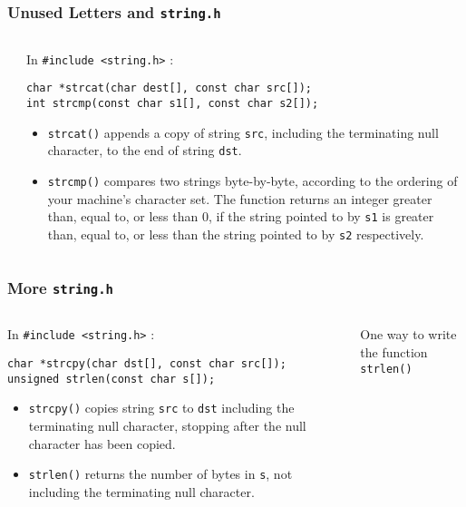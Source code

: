 \begin{frame}[fragile]
\frametitle{Unused Letters and {\tt string.h}}
\begin{columns}

\begin{column}{0.45\textwidth}

\end{column}

\pause
\begin{column}{0.45\textwidth}
In \verb^#include <string.h>^ :
{\small
\begin{verbatim}
char *strcat(char dest[], const char src[]);
int strcmp(const char s1[], const char s2[]);
\end{verbatim}
}
\begin{itemize}[<+->]
\item \verb^strcat()^ appends a copy of string \verb^src^,
including  the  terminating null character,
to  the  end  of  string  \verb^dst^.
\item \verb^strcmp()^ compares two strings byte-by-byte, according to the
     ordering  of  your  machine's  character  set.  The function
     returns an integer greater than, equal to, or less  than  0,
     if the string pointed to by \verb^s1^ is greater than, equal to, or
     less than the string pointed to by \verb^s2^ respectively.
\end{itemize}
\end{column}

\end{columns}
\end{frame}



\begin{frame}[fragile]
\frametitle{More {\tt string.h}}
\begin{columns}

\begin{column}{0.45\textwidth}
In \verb^#include <string.h>^ :
{\small
\begin{verbatim}
char *strcpy(char dst[], const char src[]);
unsigned strlen(const char s[]);
\end{verbatim}
}
\begin{itemize}[<+->]
\item \verb^strcpy()^ copies string \verb^src^ to \verb^dst^
including the  terminating null  character,
stopping after the null character has been copied.
\item \verb^strlen()^ returns the number of bytes in \verb^s^,
not including the terminating null character.
\end{itemize}
\end{column}

\pause
\begin{column}{0.45\textwidth}
One way to write the function \verb^strlen()^

\end{column}

\end{columns}
\end{frame}

